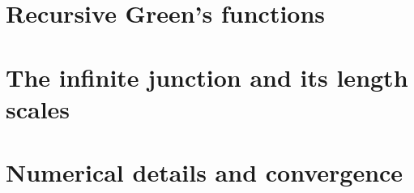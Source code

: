 \section{Recursive Green's functions}
\label{sec:rgf}
\label{sec:subspace_rgf} %
%

\section{The infinite junction and its length scales}
\label{sec:infinite}

\section{Numerical details and convergence}
\label{sec:numerics}
